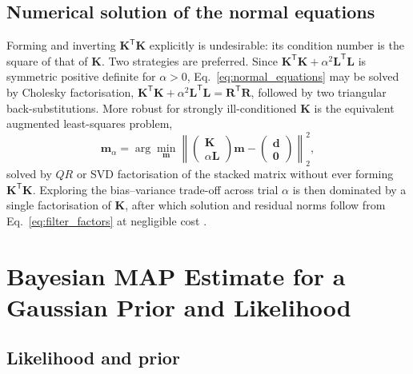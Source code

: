 \subsection{Numerical solution of the normal equations}

Forming and inverting $\mathbf{K}^{\mathsf{T}}\mathbf{K}$ explicitly is undesirable: its condition number is the square of that of $\mathbf{K}$. Two strategies are preferred. Since $\mathbf{K}^{\mathsf{T}}\mathbf{K}+\alpha^{2}\mathbf{L}^{\mathsf{T}}\mathbf{L}$ is symmetric positive definite for $\alpha>0$, Eq.~\eqref{eq:normal_equations} may be solved by Cholesky factorisation, $\mathbf{K}^{\mathsf{T}}\mathbf{K}+\alpha^{2}\mathbf{L}^{\mathsf{T}}\mathbf{L} = \mathbf{R}^{\mathsf{T}}\mathbf{R}$, followed by two triangular back-substitutions. More robust for strongly ill-conditioned $\mathbf{K}$ is the equivalent augmented least-squares problem,
\begin{equation}
\mathbf{m}_{\alpha} = \arg\min_{\mathbf{m}} \left\|
\begin{pmatrix}\mathbf{K}\\ \alpha\mathbf{L}\end{pmatrix}\mathbf{m}
-
\begin{pmatrix}\mathbf{d}\\ \mathbf{0}\end{pmatrix}
\right\|_{2}^{2},
\label{eq:augmented_ls}
\end{equation}
solved by $QR$ or SVD factorisation of the stacked matrix without ever forming $\mathbf{K}^{\mathsf{T}}\mathbf{K}$. Exploring the bias--variance trade-off across trial $\alpha$ is then dominated by a single factorisation of $\mathbf{K}$, after which solution and residual norms follow from Eq.~\eqref{eq:filter_factors} at negligible cost \cite{ref0677}.

\section{Bayesian MAP Estimate for a Gaussian Prior and Likelihood}
\label{sec:bayes}

\subsection{Likelihood and prior}


